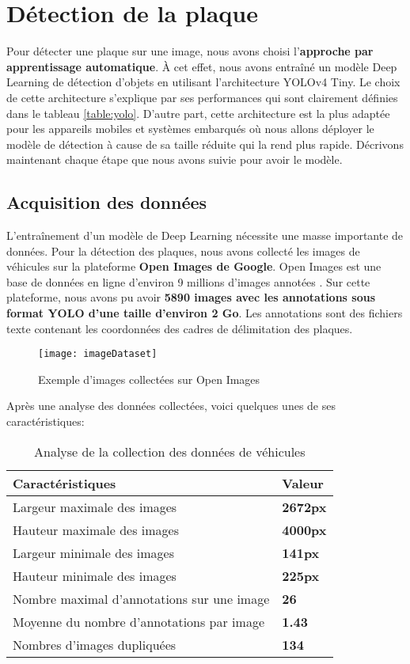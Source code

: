 \section{Détection de la plaque}
Pour détecter une plaque sur une image, nous avons choisi l’\textbf{approche par apprentissage automatique}. À cet effet, nous avons entraîné un modèle Deep Learning de détection d’objets en utilisant l’architecture YOLOv4 Tiny. Le choix de cette architecture s’explique par ses performances qui sont clairement définies dans le tableau \ref{table:yolo}. D’autre part, cette architecture est la plus adaptée pour les appareils mobiles et systèmes embarqués où nous allons déployer le modèle de détection à cause de sa taille réduite qui la rend plus rapide. Décrivons maintenant chaque étape que nous avons suivie pour avoir le modèle.
    \subsection{Acquisition des données}
    L’entraînement d’un modèle de Deep Learning nécessite une masse importante de données. Pour la détection des plaques, nous avons collecté les images de véhicules sur la plateforme \textbf{Open Images de Google}. Open Images est une base de données en ligne d'environ 9 millions d'images annotées \cite{oid6}. Sur cette plateforme, nous avons pu  avoir \textbf{5890 images avec les annotations sous format YOLO d’une taille d’environ 2 Go}. Les annotations sont des fichiers texte contenant les coordonnées des cadres de délimitation des plaques. 
    \begin{figure}[H]
        \centering
        \texttt{[image: imageDataset]}
        \caption{Exemple d'images collectées sur Open Images}
    \end{figure}
    Après une analyse des données collectées, voici quelques unes de ses caractéristiques:
    \begin{table}[H]
        \centering
        \begin{tabular}{|l|l|}
            \hline
            \rowcolor{Gray}
            \textbf{Caractéristiques} & \textbf{Valeur} \\ \hline
            Largeur maximale des images & \textbf{2672px} \\ \hline
            Hauteur maximale des images & \textbf{4000px} \\ \hline
            Largeur minimale des images & \textbf{141px} \\ \hline
            Hauteur minimale des images & \textbf{225px} \\ \hline
            Nombre maximal d'annotations sur une image & \textbf{26} \\ \hline
            Moyenne du nombre d'annotations par image & \textbf{1.43} \\ \hline
            Nombres d'images dupliquées & \textbf{134} \\ \hline
        \end{tabular}
        \caption{Analyse de la collection des données de véhicules}
    \end{table}

